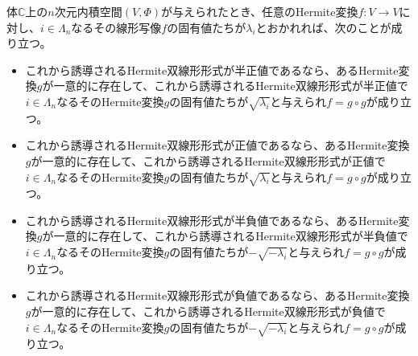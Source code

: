 \documentclass[dvipdfmx]{jsarticle}
\begin{document}
\begin{thm}\label{2.3.11.2}
体$\mathbb{C}$上の$n$次元内積空間$(V,\varPhi)$が与えられたとき、任意のHermite変換$f:V \rightarrow V$に対し、$i \in \varLambda_{n}$なるその線形写像$f$の固有値たちが$\lambda_{i}$とおかれれば、次のことが成り立つ。
\begin{itemize}
\item
  これから誘導されるHermite双線形形式が半正値であるなら、あるHermite変換$g$が一意的に存在して、これから誘導されるHermite双線形形式が半正値で$i \in \varLambda_{n}$なるそのHermite変換$g$の固有値たちが$\sqrt{\lambda_{i}}$と与えられ$f = g \circ g$が成り立つ。
\item
  これから誘導されるHermite双線形形式が正値であるなら、あるHermite変換$g$が一意的に存在して、これから誘導されるHermite双線形形式が正値で$i \in \varLambda_{n}$なるそのHermite変換$g$の固有値たちが$\sqrt{\lambda_{i}}$と与えられ$f = g \circ g$が成り立つ。
\item
  これから誘導されるHermite双線形形式が半負値であるなら、あるHermite変換$g$が一意的に存在して、これから誘導されるHermite双線形形式が半負値で$i \in \varLambda_{n}$なるそのHermite変換$g$の固有値たちが$- \sqrt{- \lambda_{i}}$と与えられ$f = g \circ g$が成り立つ。
\item
  これから誘導されるHermite双線形形式が負値であるなら、あるHermite変換$g$が一意的に存在して、これから誘導されるHermite双線形形式が負値で$i \in \varLambda_{n}$なるそのHermite変換$g$の固有値たちが$- \sqrt{- \lambda_{i}}$と与えられ$f = g \circ g$が成り立つ。
\end{itemize}
\end{thm}
\end{document}
